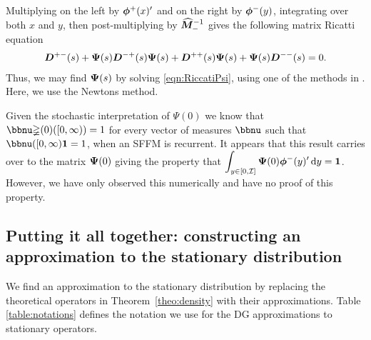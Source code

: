 Multiplying on the left by \(\boldsymbol\phi^+(x)'{}\) and on the right by \(\boldsymbol\phi^-(y)\), integrating over both \(x\) and \(y\), then post-multiplying by \(\widehat{\boldsymbol M}^{-1}_-\) gives the following matrix Ricatti equation
\begin{align}\label{eqn:RiccatiPsi}
    \boldsymbol D^{+-}(s)
+ \boldsymbol \Psi(s)   \boldsymbol D^{-+}(s)\boldsymbol \Psi(s)
+   \boldsymbol D^{++}(s)\boldsymbol \Psi(s)
+ \boldsymbol \Psi(s)  \boldsymbol D^{--}(s)
= 0.
\end{align}
Thus, we may find \(\boldsymbol \Psi(s)\) by solving \eqref{eqn:RiccatiPsi}, using one of the methods in \citep{bot08}. Here, we use the Newtons method. 

Given the stochastic interpretation of \(\mathbb\Psi(0)\) we know that \( \bbnu \mathbb\Psi(0)([0,\infty))=1\) for every vector of measures \( \bbnu\) such that \( \bbnu([0,\infty)\boldsymbol 1 = 1\), when an SFFM is recurrent. It appears that this result carries over to the matrix \(\boldsymbol \Psi(0)\) giving the property that \(\displaystyle\int_{y\in[0,\mathcal I]} \boldsymbol \Psi(0)\boldsymbol\phi^-(y)'{}\, \mathrm{d} y = \boldsymbol 1\). However, we have only observed this numerically and have no proof of this property. 

\subsection{Putting it all together: constructing an approximation to the stationary distribution}
We find an approximation to the stationary distribution by replacing the theoretical operators in Theorem~\ref{theo:density} with their approximations. Table \ref{table:notations} defines the notation we use for the DG approximations to stationary operators. 

